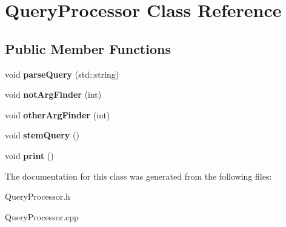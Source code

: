 \hypertarget{class_query_processor}{\section{Query\+Processor Class Reference}
\label{class_query_processor}
}
\subsection*{Public Member Functions}
\begin{DoxyCompactItemize}
\item 
\hypertarget{class_query_processor_a87834efeca2f9af6e32fb5a545d33067}{void {\bfseries parse\+Query} (std\+::string)}\label{class_query_processor_a87834efeca2f9af6e32fb5a545d33067}

\item 
\hypertarget{class_query_processor_a5b1b684b03f82b2ef8137ce630be7c33}{void {\bfseries not\+Arg\+Finder} (int)}\label{class_query_processor_a5b1b684b03f82b2ef8137ce630be7c33}

\item 
\hypertarget{class_query_processor_af6b62a64663cd688f4a55d66570a28a2}{void {\bfseries other\+Arg\+Finder} (int)}\label{class_query_processor_af6b62a64663cd688f4a55d66570a28a2}

\item 
\hypertarget{class_query_processor_a00cadfdc04ae5a048c58cbd9e7eebb1a}{void {\bfseries stem\+Query} ()}\label{class_query_processor_a00cadfdc04ae5a048c58cbd9e7eebb1a}

\item 
\hypertarget{class_query_processor_abc27ce568c2aa6cd84cfc10bca4b803b}{void {\bfseries print} ()}\label{class_query_processor_abc27ce568c2aa6cd84cfc10bca4b803b}

\end{DoxyCompactItemize}


The documentation for this class was generated from the following files\+:\begin{DoxyCompactItemize}
\item 
Query\+Processor.\+h\item 
Query\+Processor.\+cpp\end{DoxyCompactItemize}
